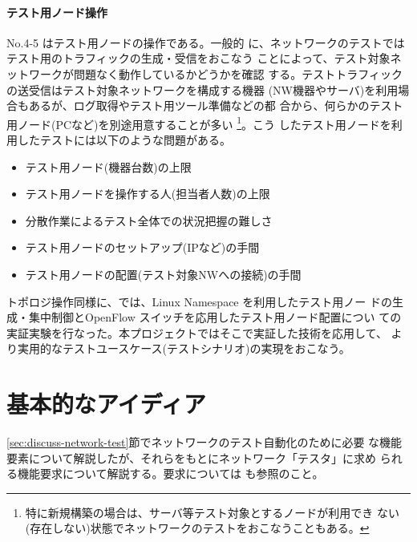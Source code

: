     \paragraph{テスト用ノード操作}
 No.4-5 はテスト用ノードの操作である。一般的
に、ネットワークのテストではテスト用のトラフィックの生成・受信をおこなう
ことによって、テスト対象ネットワークが問題なく動作しているかどうかを確認
する。テストトラフィックの送受信はテスト対象ネットワークを構成する機器
(NW機器やサーバ)を利用場合もあるが、ログ取得やテスト用ツール準備などの都
合から、何らかのテスト用ノード(PCなど)を別途用意することが多い
\footnote{特に新規構築の場合は、サーバ等テスト対象とするノードが利用でき
ない(存在しない)状態でネットワークのテストをおこなうこともある。}。こう
したテスト用ノードを利用したテストには以下のような問題がある。
\begin{itemize}
 \item テスト用ノード(機器台数)の上限
 \item テスト用ノードを操作する人(担当者人数)の上限
 \item 分散作業によるテスト全体での状況把握の難しさ
 \item テスト用ノードのセットアップ(IPなど)の手間
 \item テスト用ノードの配置(テスト対象NWへの接続)の手間
\end{itemize}

トポロジ操作同様に、\lopjc では、Linux Namespace を利用したテスト用ノー
ドの生成・集中制御とOpenFlow スイッチを応用したテスト用ノード配置につい
ての実証実験を行なった。本プロジェクトではそこで実証した技術を応用して、
より実用的なテストユースケース(テストシナリオ)の実現をおこなう。

 \section{基本的なアイディア}
 \label{sec:basic-tester-idea}



\ref{sec:discuss-network-test}節でネットワークのテスト自動化のために必要
な機能要素について解説したが、それらをもとにネットワーク「テスタ」に求め
られる機能要求について解説する。要求については \lopjtech も参照のこと。

